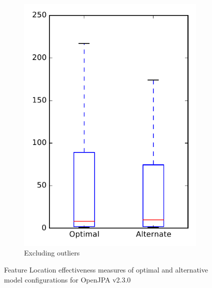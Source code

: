 \begin{figure}
\begin{subfigure}{.4\textwidth}
        \includegraphics[height=0.4\textheight]{figures/combo/flt_rq1_openjpa_no_outlier}
        \caption{Excluding outliers}\label{fig:combo:flt:rq1:openjpa_no_outlier}
    \end{subfigure}
\caption{Feature Location effectiveness measures of optimal and alternative model configurations for OpenJPA v2.3.0}
\label{fig:combo:flt:rq1:openjpa}
\end{figure}
